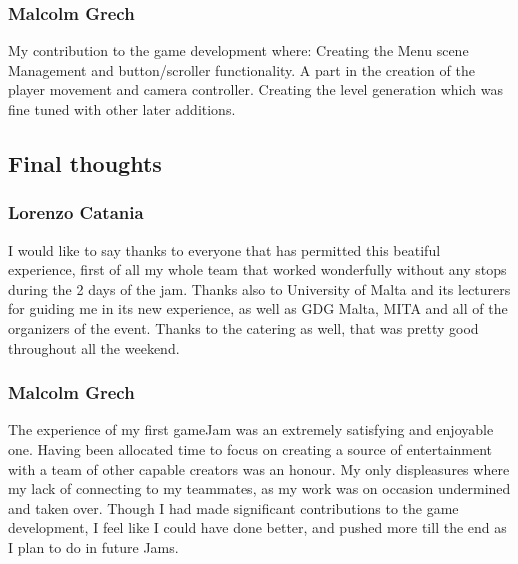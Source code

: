 \documentclass[11pt]{article}
\begin{document}
\subsubsection{Malcolm Grech}
My contribution to the game development where:
Creating the Menu scene Management and button/scroller functionality.
A part in the creation of the player movement and camera controller.
Creating the level generation which was fine tuned with other later additions.

\subsection{Final thoughts}
\subsubsection{Lorenzo Catania}
I would like to say thanks to everyone that has permitted this beatiful experience, first of all my whole team that worked wonderfully without any stops during the 2 days of the jam. Thanks also to University of Malta and its lecturers for guiding me in its new experience, as well as GDG Malta, MITA and all of the organizers of the event. Thanks to the catering as well, that was pretty good throughout all the weekend.

\subsubsection{Malcolm Grech}
The experience of my first gameJam was an extremely satisfying and enjoyable one. Having been allocated time to focus on creating a source of entertainment with a team of other capable creators was an honour. My only displeasures where my lack of connecting to my teammates, as my work was on occasion undermined and taken over. Though I had made significant contributions to the game development, I feel like I could have done better, and pushed more till the end as I plan to do in future Jams.
\end{document}
